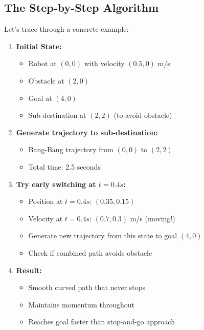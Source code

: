 \documentclass[12pt,a4paper]{article}
\begin{document}
\subsection{The Step-by-Step Algorithm}

Let's trace through a concrete example:

\begin{enumerate}
    \item \textbf{Initial State:}
    \begin{itemize}
        \item Robot at $(0, 0)$ with velocity $(0.5, 0)$ m/s
        \item Obstacle at $(2, 0)$
        \item Goal at $(4, 0)$
        \item Sub-destination at $(2, 2)$ (to avoid obstacle)
    \end{itemize}
    
    \item \textbf{Generate trajectory to sub-destination:}
    \begin{itemize}
        \item Bang-Bang trajectory from $(0,0)$ to $(2,2)$
        \item Total time: 2.5 seconds
    \end{itemize}
    
    \item \textbf{Try early switching at $t = 0.4s$:}
    \begin{itemize}
        \item Position at $t=0.4s$: $(0.35, 0.15)$
        \item Velocity at $t=0.4s$: $(0.7, 0.3)$ m/s (moving!)
        \item Generate new trajectory from this state to goal $(4, 0)$
        \item Check if combined path avoids obstacle
    \end{itemize}
    
    \item \textbf{Result:}
    \begin{itemize}
        \item Smooth curved path that never stops
        \item Maintains momentum throughout
        \item Reaches goal faster than stop-and-go approach
    \end{itemize}
\end{enumerate}
\end{document}
